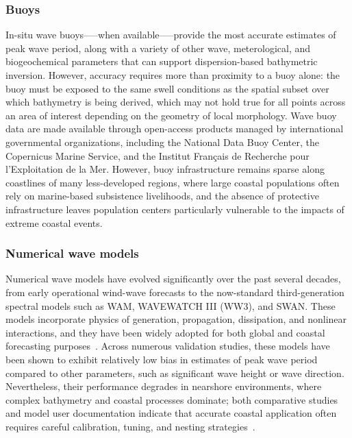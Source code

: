 \documentclass[12pt]{article}
\begin{document}
\subsubsection{Buoys}

In-situ wave buoys--—when available—--provide the most accurate estimates of peak wave period, along with a variety of other wave, meterological, and biogeochemical parameters that can support dispersion-based bathymetric inversion. However, accuracy requires more than proximity to a buoy alone: the buoy must be exposed to the same swell conditions as the spatial subset over which bathymetry is being derived, which may not hold true for all points across an area of interest depending on the geometry of local morphology. Wave buoy data are made available through open-access products managed by international governmental organizations, including the National Data Buoy Center, the Copernicus Marine Service, and the Institut Français de Recherche pour l'Exploitation de la Mer. However, buoy infrastructure remains sparse along coastlines of many less-developed regions, where large coastal populations often rely on marine-based subsistence livelihoods, and the absence of protective infrastructure leaves population centers particularly vulnerable to the impacts of extreme coastal events.

\subsubsection{Numerical wave models}
Numerical wave models have evolved significantly over the past several decades, from early operational wind-wave forecasts to the now-standard third-generation spectral models such as WAM, WAVEWATCH III (WW3), and SWAN. These models incorporate physics of generation, propagation, dissipation, and nonlinear interactions, and they have been widely adopted for both global and coastal forecasting purposes~\cite{Rogers2018, SWANTechnicalDocumentation, Tolman2008}. Across numerous validation studies, these models have been shown to exhibit relatively low bias in estimates of peak wave period compared to other parameters, such as significant wave height or wave direction.~\cite{PadillaHernandez2007} Nevertheless, their performance degrades in nearshore environments, where complex bathymetry and coastal processes dominate; both comparative studies and model user documentation indicate that accurate coastal application often requires careful calibration, tuning, and nesting strategies~\cite{SWANTechnicalDocumentation,PadillaHernandez2007,Ferdaus2025}.
\end{document}
